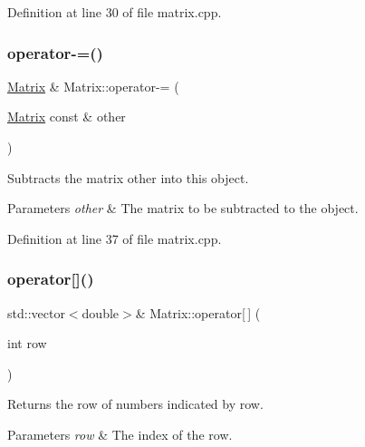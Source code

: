 Definition at line 30 of file matrix.\+cpp.

\mbox{\label{classMatrix_a5871f028dc8b3ae8043a942b5840cdec}} 
\subsubsection{\texorpdfstring{operator-\/=()}{operator-=()}}
{\footnotesize\ttfamily \hyperlink{classMatrix}{Matrix} \& Matrix\+::operator-\/= (\begin{DoxyParamCaption}\item[{\hyperlink{classMatrix}{Matrix} const \&}]{other }\end{DoxyParamCaption})}

Subtracts the matrix {\ttfamily other} into this object.


\begin{DoxyParams}{Parameters}
{\em other} & The matrix to be subtracted to the object. \\
\hline
\end{DoxyParams}


Definition at line 37 of file matrix.\+cpp.

\mbox{\label{classMatrix_a25cb20c90560327240a07d81ed11c746}} 
\subsubsection{\texorpdfstring{operator[]()}{operator[]()}\hspace{0.1cm}{\footnotesize\ttfamily [1/2]}}
{\footnotesize\ttfamily std\+::vector$<$double$>$\& Matrix\+::operator\mbox{[}$\,$\mbox{]} (\begin{DoxyParamCaption}\item[{int}]{row }\end{DoxyParamCaption})\hspace{0.3cm}{\ttfamily [inline]}}

Returns the row of numbers indicated by {\ttfamily row}.


\begin{DoxyParams}{Parameters}
{\em row} & The index of the row. \\
\hline
\end{DoxyParams}


